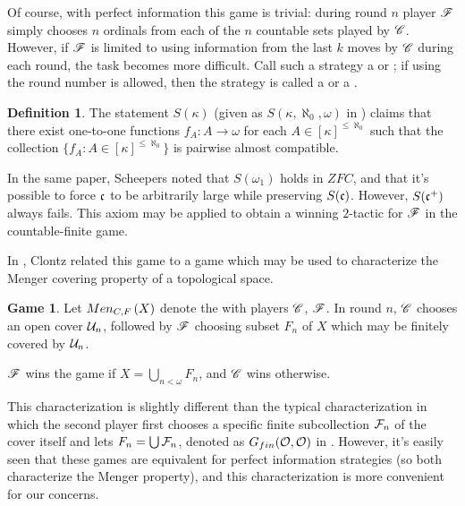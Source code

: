\documentclass{amsart}
\theoremstyle{plain}
\theoremstyle{definition}
\newtheorem{definition}[theorem]{Definition}
\newtheorem{game}[theorem]{Game}
\theoremstyle{remark}
\theoremstyle{plain}
\theoremstyle{definition}
\theoremstyle{remark}
\begin{document}
  Of course, with perfect information this game is trivial: during round
  \(n\) player \(\mathscr{F}\) simply chooses \(n\) ordinals from each of the
  \(n\) countable sets played by \(\mathscr{C}\). However, if \(\mathscr{F}\) is limited
  to using information from the last \(k\) moves by \(\mathscr{C}\) during each
  round, the task becomes more difficult. Call such a strategy a
   or ; if using the round
  number is allowed, then the strategy is called a 
  or a .

  \begin{definition}
    The statement \(S(\kappa)\) (given as \(S(\kappa,\aleph_0,\omega)\)
    in \cite{MR1129143}) claims that there exist one-to-one functions
    \(f_A:A\to\omega\) for each \(A\in[\kappa]^{\leq\aleph_0}\) such that
    the collection \(\{f_A:A\in[\kappa]^{\leq\aleph_0}\}\) is pairwise
    almost compatible.
  \end{definition}

  In the same paper, Scheepers noted that \(S(\omega_1)\) holds in \(ZFC\),
  and that it's possible to force \(\mathfrak{c}\) to be arbitrarily large
  while preserving \(S(\mathfrak{c})\). However, \(S(\mathfrak{c}^+)\) always fails.
  This axiom may be applied to obtain a winning \(2\)-tactic for \(\mathscr{F}\)
  in the countable-finite game.

  In \cite{clontzMengerGamePreprint}, Clontz related this game to a game
  which may be used to characterize the Menger covering property of a
  topological space.

  \begin{game}
    Let \(Men_{C,F}\left({X}\right)\) denote the  with players \(\mathscr{C}\),
    \(\mathscr{F}\).
    In round \(n\), \(\mathscr{C}\) chooses an open cover \(\mathcal{U}_n\), followed by
    \(\mathscr{F}\)
    choosing subset \(F_n\) of \(X\) which may be finitely covered by \(\mathcal{U}_n\).

    \(\mathscr{F}\) wins the game if \(X = \bigcup_{n<\omega}F_n\),
    and \(\mathscr{C}\) wins otherwise.
  \end{game}

  This characterization is slightly different than the typical characterization
  in which the second player first chooses a specific
  finite subcollection \(\mathcal{F}_n\) of the cover itself and lets
  \(F_n=\bigcup \mathcal{F}_n\), denoted as \(G_{fin}(\mathcal{O},\mathcal{O})\)
  in \cite{MR1378387}.
  However, it's easily seen that these games are equivalent
  for perfect information strategies (so both characterize
  the Menger property), and this characterization is
  more convenient for our concerns.
\end{document}
